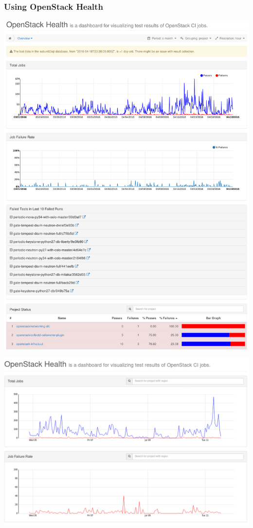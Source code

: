 \documentclass[aspectratio=169,11pt,hyperref={colorlinks=true}]{beamer}
\begin{document}
\begin{frame}
    \frametitle{Using OpenStack Health}
    \begin{center}
        \includegraphics[height=.9\textheight]{HomePage.png}
    \end{center}
\end{frame}

\begin{frame}
    \centering
    \includegraphics[height=\textheight]{o-h_main_graphs.png}
\end{frame}
\end{document}
